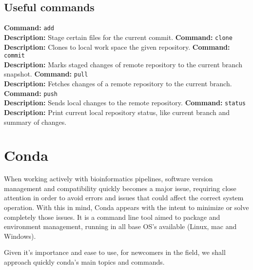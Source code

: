 \documentclass[a4paper,11pt]{article}
\begin{document}
\subsection{Useful commands}
\begin{cheatsheetbox}
\textbf{Command:} \texttt{add} \\
\textbf{Description:} Stage certain files for the current commit.
\noindent\makebox[\linewidth]{\dotfill}
\textbf{Command:} \texttt{clone} \\
\textbf{Description:} Clones to local work space the given repository.
\noindent\makebox[\linewidth]{\dotfill}
\textbf{Command:} \texttt{commit} \\
\textbf{Description:} Marks staged changes of remote repository to the current
branch snapshot.
\noindent\makebox[\linewidth]{\dotfill}
\textbf{Command:} \texttt{pull} \\
\textbf{Description:} Fetches changes of a remote repository to the current
branch.
\noindent\makebox[\linewidth]{\dotfill}
\textbf{Command:} \texttt{push} \\
\textbf{Description:} Sends local changes to the remote repository.
\noindent\makebox[\linewidth]{\dotfill}
\textbf{Command:} \texttt{status} \\
\textbf{Description:} Print current local repository status, like current branch
and summary of changes.
\end{cheatsheetbox}
\section{Conda}
When working actively with bioinformatics pipelines, software version management
and compatibility quickly becomes a major issue, requiring close attention in
order to avoid errors and issues that could affect the correct system operation.
With this in mind, Conda appears with the intent to minimize or solve completely
those issues. It is a command line tool aimed to package and environment
management, running in all base OS's available (Linux, mac and Windows).\par
Given it's importance and ease to use, for newcomers in the field, we shall
approach quickly conda's main topics and commands.
\end{document}
